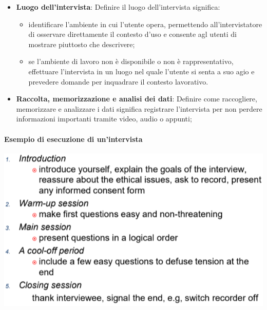 \documentclass{report}
\begin{document}
\begin{itemize}
\begin{itemize}
		\end{itemize}
		\item \textbf{Luogo dell'intervista}: Definire il luogo dell'intervista significa:
		\begin{itemize}
			\item identificare l'ambiente in cui l'utente opera, permettendo all'intervistatore di osservare direttamente il contesto d'uso e consente agl utenti di mostrare piuttosto che descrivere;
			\item se l'ambiente di lavoro non è disponibile o non è rappresentativo, effettuare l'intervista in un luogo nel quale l'utente si senta a suo agio e prevedere domande per inquadrare il contesto lavorativo.
		\end{itemize}
		\item \textbf{Raccolta, memorizzazione e analisi dei dati}: Definire come raccogliere, memorizzare e analizzare i dati significa registrare l'intervista per non perdere informazioni importanti tramite video, audio o appunti;
	\end{itemize}

	\paragraph{Esempio di esecuzione di un'intervista}
	\begin{center}
		\includegraphics[scale=0.5]{assets/intervista.png}
	\end{center}
\end{document}
